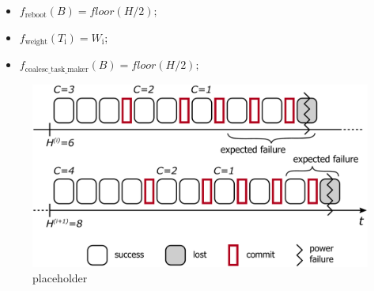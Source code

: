 \begin{itemize}
\item $f_\text{reboot}(B) = floor(H / 2);$
\item $f_\text{weight}(T_\text{i}) =  W_\text{i}$; 
\item $f_\text{coalesc\_task\_maker}(B) = floor(H / 2);$ 
\end{itemize}

\begin{figure}
	\centering
	\includegraphics[width=0.5\columnwidth]{figures/energy-aware-coal.pdf}
	\caption{placeholder}
	\label{fig:energyAware}
\end{figure}

































